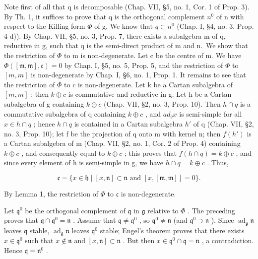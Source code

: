 Note first of all that q is decomposable (Chap. VII, §5, no. 1, Cor. 1 of Prop. 3). By Th. 1, it suffices to prove that q is the orthogonal complement \(n^{0}\) of n with respect to the Killing form \(\varPhi\) of g. We know that \(q \subset n^{0}\) (Chap. I, §4, no. 3, Prop. 4 d)). By Chap. VII, §5, no. 3, Prop. 7, there exists a subalgebra m of q, reductive in g, such that q is the semi-direct product of m and n.~We show that the restriction of \(\varPhi\) to m is non-degenerate. Let c be the centre of m. We have \(\Phi([\mathfrak{m},\mathfrak{m}],\mathfrak{c})=0\) by Chap. I, §5, no. 5, Prop. 5, and the restriction of \(\Phi\) to \([m,m]\) is non-degenerate by Chap. I, §6, no. 1, Prop. 1. It remains to see that the restriction of \(\Phi\) to c is non-degenerate. Let k be a Cartan subalgebra of \([m,m]\) ; then \(k\oplus c\) is commutative and reductive in g. Let h be a Cartan subalgebra of g containing \(k\oplus c\) (Chap. VII, §2, no. 3, Prop. 10). Then \(h\cap q\) is a commutative subalgebra of q containing \(k\oplus c\) , and \(ad_{q}x\) is semi-simple for all \(x\in h\cap q\) ; hence \(h\cap q\) is contained in a Cartan subalgebra \(h'\) of q (Chap. VII, §2, no. 3, Prop. 10); let f be the projection of q onto m with kernel n; then \(f(h')\) is a Cartan subalgebra of m (Chap. VII, §2, no. 1, Cor. 2 of Prop. 4) containing \(k\oplus c\) , and consequently equal to \(k\oplus c\) ; this proves that \(f(h\cap q)=k\oplus c\) , and since every element of h is semi-simple in g, we have \(h\cap q=k\oplus c\) . Thus,

\[
\mathfrak {c} = \{x \in \mathfrak {h} \mid [ x, \mathfrak {n} ] \subset \mathfrak {n} \text {   and   } [ x, [ \mathfrak {m}, \mathfrak {m} ] ] = 0 \}.
\]

By Lemma 1, the restriction of \(\varPhi\) to \(\mathfrak{c}\) is non-degenerate.

Let \(\mathfrak{q}^0\) be the orthogonal complement of \(\mathfrak{q}\) in \(\mathfrak{g}\) relative to \(\varPhi\) . The preceding proves that \(\mathfrak{q} \cap \mathfrak{q}^0 = \mathfrak{n}\) . Assume that \(\mathfrak{q} \neq \mathfrak{q}^0\) , so \(\mathfrak{q}^0 \neq \mathfrak{n}\) (and \(\mathfrak{q}^0 \supset \mathfrak{n}\) ). Since \(\operatorname{ad}_{\mathfrak{g}} \mathfrak{n}\) leaves \(\mathfrak{q}\) stable, \(\operatorname{ad}_{\mathfrak{g}} \mathfrak{n}\) leaves \(\mathfrak{q}^0\) stable; Engel's theorem proves that there exists \(x \in \mathfrak{q}^0\) such that \(x \notin \mathfrak{n}\) and \([x, \mathfrak{n}] \subset \mathfrak{n}\) . But then \(x \in \mathfrak{q}^0 \cap \mathfrak{q} = \mathfrak{n}\) , a contradiction. Hence \(\mathfrak{q} = \mathfrak{n}^0\) .

